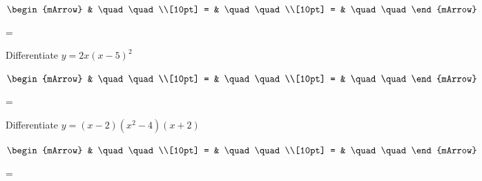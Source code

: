 \begin{mtask}[resume]
\begin{exercise}
           \begin{envSolution}
             $\begin{mArrow}
                   & \quad \quad              \\[10pt]
		   		 = & \quad \quad              \\[10pt]
				 = & \quad \quad 
              \end{mArrow}$
            \begin{shortsolution}  
			     =$ \quad \quad \quad \quad$
			\end{shortsolution}				 
           \end{envSolution}
         \end{exercise}
	\task \begin{exercise} Differentiate $y=2x(x-5)^2 $
           \begin{envSolution}
             $\begin{mArrow}
                   & \quad \quad              \\[10pt]
		   		 = & \quad \quad              \\[10pt]
				 = & \quad \quad 
              \end{mArrow}$
            \begin{shortsolution}  
			     =$ \quad \quad \quad \quad$
			\end{shortsolution}				 
           \end{envSolution}
         \end{exercise}
	\task \begin{exercise} Differentiate $y=(x-2)(x^2-4)(x+2) $
           \begin{envSolution}
             $\begin{mArrow}
                   & \quad \quad              \\[10pt]
		   		 = & \quad \quad              \\[10pt]
				 = & \quad \quad 
              \end{mArrow}$
            \begin{shortsolution}  
			     =$ \quad \quad \quad \quad$
			\end{shortsolution}				 
           \end{envSolution}
         \end{exercise}
\end{mtask}

